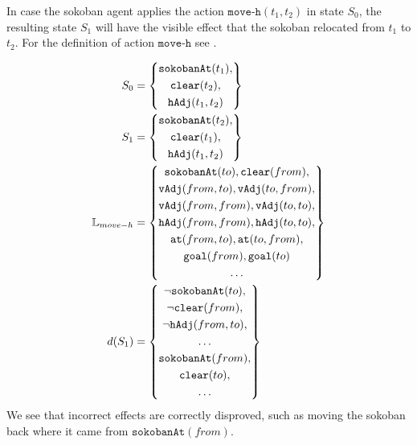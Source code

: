 \documentclass[../Master.tex]{subfiles}
\begin{document}
\begin{example} \label{ex:nca:moveSucceeded-disproving-effects}
	In case the sokoban agent applies the action $\texttt{move-h}(t_1, t_2)$ in state $S_0$, the resulting state $S_1$ will have the visible effect that the sokoban relocated from $t_1$ to $t_2$. 
	For the definition of action $\texttt{move-h}$ see .
	
	
	\begin{equation*}
		\begin{split}
		S_0 &=
		\left\{
		\begin{gathered}
			\texttt{sokobanAt}(t_1), \\
			\texttt{clear}(t_2),\\
			\texttt{hAdj}(t_1, t_2)	
		\end{gathered}
		\right\} \\
		S_1 &=
		\left\{
		\begin{gathered}
			\texttt{sokobanAt}(t_2), \\
			\texttt{clear}(t_1), \\
			\texttt{hAdj}(t_1, t_2)			
		\end{gathered}
		\right\} \\		
		\mathbb{L}_{move-h} &= \left\{
		\begin{gathered}
			\texttt{sokobanAt}(to), \texttt{clear}(from), \\
			\texttt{vAdj}(from, to), \texttt{vAdj}(to, from), \\
			\texttt{vAdj}(from, from), \texttt{vAdj}(to, to), \\
			\texttt{hAdj}(from, from), \texttt{hAdj}(to, to), \\
			\texttt{at}(from, to), \texttt{at}(to, from), \\
			\texttt{goal}(from), \texttt{goal}(to)  \\
			\dots
		\end{gathered}
		\right\} \\
		d(S_1) &= \left\{
		\begin{gathered}
			\neg \texttt{sokobanAt}(to), \\
			\neg \texttt{clear}(from), \\
			\neg \texttt{hAdj}(from, to), \\
			\dots \\
			\texttt{sokobanAt}(from), \\
			\texttt{clear}(to), \\
			\dots			
		\end{gathered}
		\right\}
		\end{split}
	\end{equation*}
We see that incorrect effects are correctly disproved, such as moving the sokoban back where it came from $\texttt{sokobanAt}(from)$.
\end{example}
\end{document}
